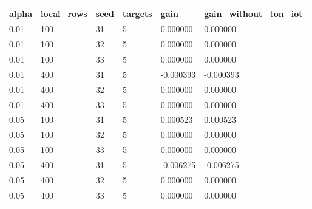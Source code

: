 \begin{tabular}{llllll}
\toprule
alpha & local\_rows & seed & targets & gain & gain\_without\_ton\_iot \\
\midrule
0.01 & 100 & 31 & 5 & 0.000000 & 0.000000 \\
0.01 & 100 & 32 & 5 & 0.000000 & 0.000000 \\
0.01 & 100 & 33 & 5 & 0.000000 & 0.000000 \\
0.01 & 400 & 31 & 5 & -0.000393 & -0.000393 \\
0.01 & 400 & 32 & 5 & 0.000000 & 0.000000 \\
0.01 & 400 & 33 & 5 & 0.000000 & 0.000000 \\
0.05 & 100 & 31 & 5 & 0.000523 & 0.000523 \\
0.05 & 100 & 32 & 5 & 0.000000 & 0.000000 \\
0.05 & 100 & 33 & 5 & 0.000000 & 0.000000 \\
0.05 & 400 & 31 & 5 & -0.006275 & -0.006275 \\
0.05 & 400 & 32 & 5 & 0.000000 & 0.000000 \\
0.05 & 400 & 33 & 5 & 0.000000 & 0.000000 \\
\bottomrule
\end{tabular}
